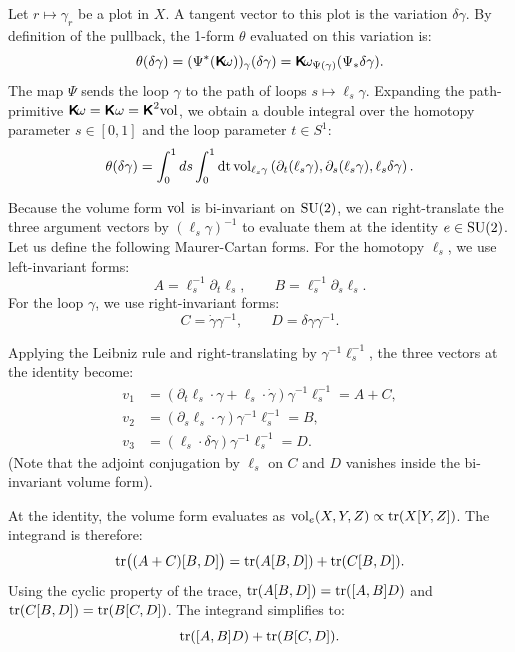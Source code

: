 \documentclass[11pt,reqno,letterpaper,twoside]{amsart}
\renewcommand{\Komega}{\CHO\!\omega}
\begin{document}
  Let $r \mapsto \gamma_r$ be a plot in $X$.
  A tangent vector to this plot is the variation $\delta\gamma$.
  By definition of the pullback,
  the 1-form $\theta$ evaluated on this variation is:
  \[
    \theta(\delta\gamma) = (\Psi^*(\Komega))_\gamma(\delta\gamma) = \Komega_{\Psi(\gamma)}(\Psi_* \delta\gamma).
    \]
  The map $\Psi$ sends the loop $\gamma$ to the path of loops $s \mapsto \ell_s \gamma$.
  Expanding the path-primitive $\Komega = \CHO\omega = \CHO^2\Vol$,
  we obtain a double integral over the homotopy parameter $s \in [0,1]$ and the loop parameter $t \in S^1$:
  \[
    \theta(\delta\gamma) = \int_0^1 ds \int_0^1 \mathrm{dt} \, \mathrm{vol}_{\ell_s\gamma} \left( \partial_t(\ell_s \gamma), \partial_s(\ell_s \gamma), \ell_s \delta\gamma \right).
    \]
  
  Because the volume form $\mathrm{vol}$ is bi-invariant on $\mathrm{SU}(2)$,
  we can right-translate the three argument vectors by $(\ell_s \gamma)^{-1}$ to evaluate them at the identity $e \in \mathrm{SU}(2)$.
  Let us define the following Maurer-Cartan forms.
  For the homotopy $\ell_s$, we use left-invariant forms:
  \[
    A = \ell_s^{-1} \partial_t \ell_s, \qquad B = \ell_s^{-1} \partial_s \ell_s.
    \]
  For the loop $\gamma$, we use right-invariant forms:
  \[
    C = \dot{\gamma}\gamma^{-1}, \qquad D = \delta\gamma \gamma^{-1}.
    \]
  
  Applying the Leibniz rule and right-translating by $\gamma^{-1} \ell_s^{-1}$,
  the three vectors at the identity become:
  \begin{align*}
    v_1 &= (\partial_t \ell_s \cdot \gamma + \ell_s \cdot \dot{\gamma}) \gamma^{-1} \ell_s^{-1} = A + C, \\
    v_2 &= (\partial_s \ell_s \cdot \gamma) \gamma^{-1} \ell_s^{-1} = B, \\
    v_3 &= (\ell_s \cdot \delta\gamma) \gamma^{-1} \ell_s^{-1} = D.
  \end{align*}
  (Note that the adjoint conjugation by $\ell_s$ on $C$ and $D$ vanishes inside the bi-invariant volume form).
  
  At the identity,
  the volume form evaluates as $\mathrm{vol}_e(X, Y, Z) \propto \operatorname{tr}(X[Y, Z])$.
  The integrand is therefore:
  \[
    \operatorname{tr}\bigl( (A+C)[B, D] \bigr) = \operatorname{tr}(A[B, D]) + \operatorname{tr}(C[B, D]).
    \]
  Using the cyclic property of the trace,
  $\operatorname{tr}(A[B, D]) = \operatorname{tr}([A, B]D)$ and $\operatorname{tr}(C[B, D]) = \operatorname{tr}(B[C, D])$.
  The integrand simplifies to:
  \[
    \operatorname{tr}([A, B]D) + \operatorname{tr}(B[C, D]).
    \]
  
\end{document}
